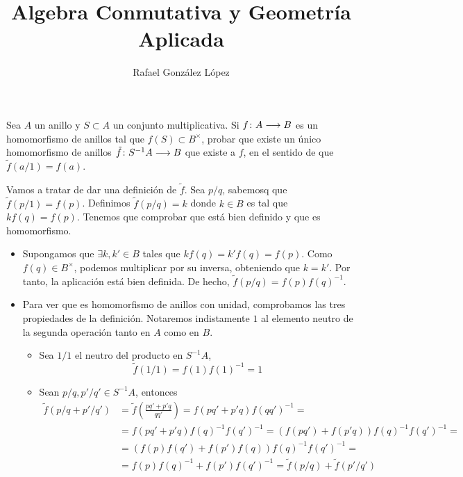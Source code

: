\documentclass[twoside]{article}
\begin{document}
\title{Algebra Conmutativa y Geometría Aplicada}
\author{Rafael González López}
\maketitle

\begin{ejercicio}{1}
Sea $A$ un anillo y $S\subset A$ un conjunto multiplicativa. Si $f\colon{A}\longrightarrow{B}$ es un homomorfismo de anillos tal que $f(S)\subset B^\times$, probar que existe un único homomorfismo de anillos $\tilde{f}\colon{S^{-1}A}\longrightarrow{B}$ que existe a $f$, en el sentido de que $\tilde{f}(a/1) = f(a)$.
\begin{solucion}
Vamos a tratar de dar una definición de $\tilde{f}$. Sea $p/q$, sabemosq que $\tilde{f}(p/1)=f(p)$. Definimos $\tilde{f}(p/q)=k$ donde $k\in B$ es tal que $kf(q)=f(p)$. Tenemos que comprobar que está bien definido y que es homomorfismo.
\begin{itemize}
\item Supongamos que $\exists k,k'\in B$ tales que $kf(q)=k'f(q)=f(p)$. Como $f(q)\in B^\times$, podemos multiplicar por su inversa, obteniendo que $k=k'$. Por tanto, la aplicación está bien definida. De hecho, $\tilde{f}(p/q)=f(p)f(q)^{-1}$.
\item Para ver que es homomorfismo de anillos con unidad, comprobamos las tres propiedades de la definición. Notaremos indistamente $1$ al elemento neutro de la segunda operación tanto en $A$ como en $B$.
\begin{itemize}
\item Sea $1/1$ el neutro del producto en $S^{-1}A$, 
$$\tilde{f}(1/1)=f(1)f(1)^{-1}=1$$
\item Sean $p/q,p'/q' \in S^{-1}A$, entonces
\begin{align*}
\tilde{f}(p/q+p'/q') &= 	\tilde{f}\left(\frac{pq'+p'q}{qq'}\right) = f(pq'+p'q)f(qq')^{-1} = \\
 &= f(pq'+p'q)f(q)^{-1}f(q')^{-1} =
(f(pq')+f(p'q))f(q)^{-1}f(q')^{-1} = \\
&= (f(p)f(q')+f(p')f(q))f(q)^{-1}f(q')^{-1}  =\\
 &= f(p)f(q)^{-1}+f(p')f(q')^{-1} = \tilde{f}(p/q)+\tilde{f}(p'/q')
\end{align*}


\end{itemize}
\end{itemize}
\end{solucion}
\end{ejercicio}
\end{document}

